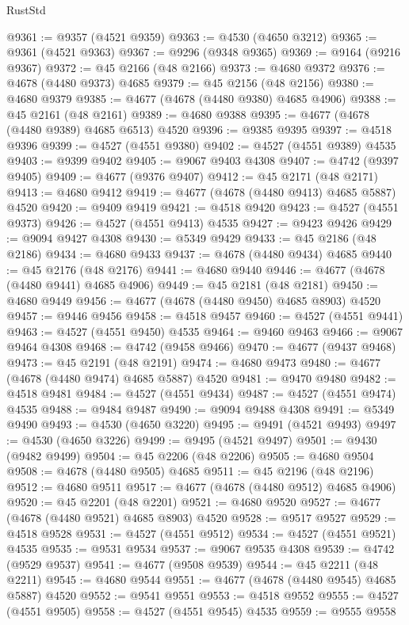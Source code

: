 \begin{lexlean}{RustStd}
\begin{coremodule}
@9361 := @9357 (@4521 @9359)
@9363 := @4530 (@4650 @3212)
@9365 := @9361 (@4521 @9363)
@9367 := @9296 (@9348 @9365)
@9369 := @9164 (@9216 @9367)
@9372 := @45 @2166 (@48 @2166)
@9373 := @4680 @9372
@9376 := @4678 (@4480 @9373) @4685
@9379 := @45 @2156 (@48 @2156)
@9380 := @4680 @9379
@9385 := @4677 (@4678 (@4480 @9380) @4685 @4906)
@9388 := @45 @2161 (@48 @2161)
@9389 := @4680 @9388
@9395 := @4677 (@4678 (@4480 @9389) @4685 @6513) @4520
@9396 := @9385 @9395
@9397 := @4518 @9396
@9399 := @4527 (@4551 @9380)
@9402 := @4527 (@4551 @9389) @4535
@9403 := @9399 @9402
@9405 := @9067 @9403 @4308
@9407 := @4742 (@9397 @9405)
@9409 := @4677 (@9376 @9407)
@9412 := @45 @2171 (@48 @2171)
@9413 := @4680 @9412
@9419 := @4677 (@4678 (@4480 @9413) @4685 @5887) @4520
@9420 := @9409 @9419
@9421 := @4518 @9420
@9423 := @4527 (@4551 @9373)
@9426 := @4527 (@4551 @9413) @4535
@9427 := @9423 @9426
@9429 := @9094 @9427 @4308
@9430 := @5349 @9429
@9433 := @45 @2186 (@48 @2186)
@9434 := @4680 @9433
@9437 := @4678 (@4480 @9434) @4685
@9440 := @45 @2176 (@48 @2176)
@9441 := @4680 @9440
@9446 := @4677 (@4678 (@4480 @9441) @4685 @4906)
@9449 := @45 @2181 (@48 @2181)
@9450 := @4680 @9449
@9456 := @4677 (@4678 (@4480 @9450) @4685 @8903) @4520
@9457 := @9446 @9456
@9458 := @4518 @9457
@9460 := @4527 (@4551 @9441)
@9463 := @4527 (@4551 @9450) @4535
@9464 := @9460 @9463
@9466 := @9067 @9464 @4308
@9468 := @4742 (@9458 @9466)
@9470 := @4677 (@9437 @9468)
@9473 := @45 @2191 (@48 @2191)
@9474 := @4680 @9473
@9480 := @4677 (@4678 (@4480 @9474) @4685 @5887) @4520
@9481 := @9470 @9480
@9482 := @4518 @9481
@9484 := @4527 (@4551 @9434)
@9487 := @4527 (@4551 @9474) @4535
@9488 := @9484 @9487
@9490 := @9094 @9488 @4308
@9491 := @5349 @9490
@9493 := @4530 (@4650 @3220)
@9495 := @9491 (@4521 @9493)
@9497 := @4530 (@4650 @3226)
@9499 := @9495 (@4521 @9497)
@9501 := @9430 (@9482 @9499)
@9504 := @45 @2206 (@48 @2206)
@9505 := @4680 @9504
@9508 := @4678 (@4480 @9505) @4685
@9511 := @45 @2196 (@48 @2196)
@9512 := @4680 @9511
@9517 := @4677 (@4678 (@4480 @9512) @4685 @4906)
@9520 := @45 @2201 (@48 @2201)
@9521 := @4680 @9520
@9527 := @4677 (@4678 (@4480 @9521) @4685 @8903) @4520
@9528 := @9517 @9527
@9529 := @4518 @9528
@9531 := @4527 (@4551 @9512)
@9534 := @4527 (@4551 @9521) @4535
@9535 := @9531 @9534
@9537 := @9067 @9535 @4308
@9539 := @4742 (@9529 @9537)
@9541 := @4677 (@9508 @9539)
@9544 := @45 @2211 (@48 @2211)
@9545 := @4680 @9544
@9551 := @4677 (@4678 (@4480 @9545) @4685 @5887) @4520
@9552 := @9541 @9551
@9553 := @4518 @9552
@9555 := @4527 (@4551 @9505)
@9558 := @4527 (@4551 @9545) @4535
@9559 := @9555 @9558

\end{coremodule}
\end{lexlean}
